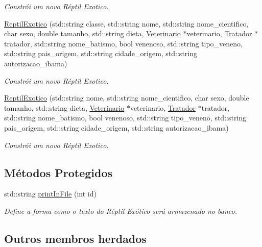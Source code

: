 \begin{DoxyCompactItemize}
\begin{DoxyCompactList}\small\item\em Constrói um novo Réptil Exotico. \end{DoxyCompactList}\item 
\hyperlink{classReptilExotico_ac94be36ef3b9bcf3045bf4cba09fe2c0}{Reptil\+Exotico} (std\+::string classe, std\+::string nome, std\+::string nome\+\_\+cientifico, char sexo, double tamanho, std\+::string dieta, \hyperlink{classVeterinario}{Veterinario} $\ast$veterinario, \hyperlink{classTratador}{Tratador} $\ast$tratador, std\+::string nome\+\_\+batismo, bool venenoso, std\+::string tipo\+\_\+veneno, std\+::string pais\+\_\+origem, std\+::string cidade\+\_\+origem, std\+::string autorizacao\+\_\+ibama)
\begin{DoxyCompactList}\small\item\em Constrói um novo Réptil Exotico. \end{DoxyCompactList}\item 
\hyperlink{classReptilExotico_a6f235b3c70d16cbd6686a7285849593c}{Reptil\+Exotico} (std\+::string nome, std\+::string nome\+\_\+cientifico, char sexo, double tamanho, std\+::string dieta, \hyperlink{classVeterinario}{Veterinario} $\ast$veterinario, \hyperlink{classTratador}{Tratador} $\ast$tratador, std\+::string nome\+\_\+batismo, bool venenoso, std\+::string tipo\+\_\+veneno, std\+::string pais\+\_\+origem, std\+::string cidade\+\_\+origem, std\+::string autorizacao\+\_\+ibama)
\begin{DoxyCompactList}\small\item\em Constrói um novo Réptil Exotico. \end{DoxyCompactList}\end{DoxyCompactItemize}
\subsection*{Métodos Protegidos}
\begin{DoxyCompactItemize}
\item 
std\+::string \hyperlink{classReptilExotico_a71312f425b92e04d8f29a856abd83f26}{print\+In\+File} (int id)
\begin{DoxyCompactList}\small\item\em Define a forma como o texto do Réptil Exótico será armazenado no banco. \end{DoxyCompactList}\end{DoxyCompactItemize}
\subsection*{Outros membros herdados}


